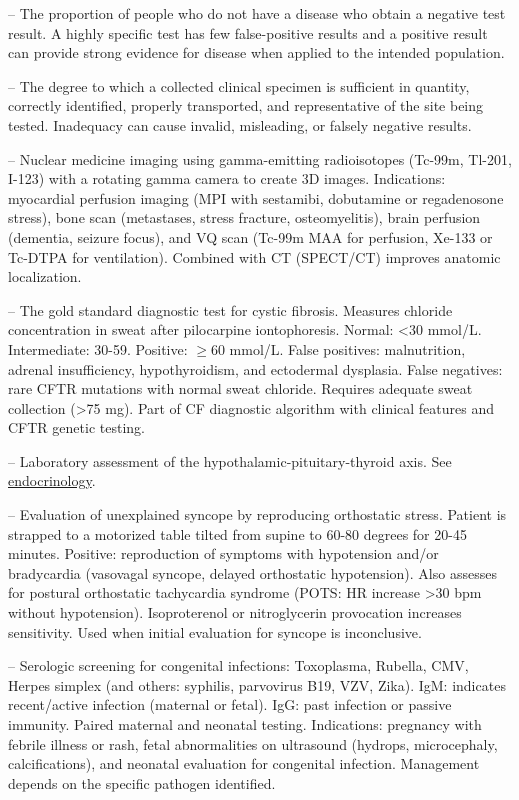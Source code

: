 -- The proportion of people who do not have a disease who obtain a negative test result. A highly specific test has few false-positive results and a positive result can provide strong evidence for disease when applied to the intended population.

-- The degree to which a collected clinical specimen is sufficient in quantity, correctly identified, properly transported, and representative of the site being tested. Inadequacy can cause invalid, misleading, or falsely negative results.

-- Nuclear medicine imaging using gamma-emitting radioisotopes (Tc-99m, Tl-201, I-123) with a rotating gamma camera to create 3D images. Indications: myocardial perfusion imaging (MPI with sestamibi, dobutamine or regadenosone stress), bone scan (metastases, stress fracture, osteomyelitis), brain perfusion (dementia, seizure focus), and VQ scan (Tc-99m MAA for perfusion, Xe-133 or Tc-DTPA for ventilation). Combined with CT (SPECT/CT) improves anatomic localization.

-- The gold standard diagnostic test for cystic fibrosis. Measures chloride concentration in sweat after pilocarpine iontophoresis. Normal: <30 mmol/L. Intermediate: 30-59. Positive: \(\ge\)60 mmol/L. False positives: malnutrition, adrenal insufficiency, hypothyroidism, and ectodermal dysplasia. False negatives: rare CFTR mutations with normal sweat chloride. Requires adequate sweat collection (>75 mg). Part of CF diagnostic algorithm with clinical features and CFTR genetic testing.

-- Laboratory assessment of the hypothalamic-pituitary-thyroid axis. See \hyperlink{Endocrinology}{endocrinology}.

-- Evaluation of unexplained syncope by reproducing orthostatic stress. Patient is strapped to a motorized table tilted from supine to 60-80 degrees for 20-45 minutes. Positive: reproduction of symptoms with hypotension and/or bradycardia (vasovagal syncope, delayed orthostatic hypotension). Also assesses for postural orthostatic tachycardia syndrome (POTS: HR increase >30 bpm without hypotension). Isoproterenol or nitroglycerin provocation increases sensitivity. Used when initial evaluation for syncope is inconclusive.

-- Serologic screening for congenital infections: Toxoplasma, Rubella, CMV, Herpes simplex (and others: syphilis, parvovirus B19, VZV, Zika). IgM: indicates recent/active infection (maternal or fetal). IgG: past infection or passive immunity. Paired maternal and neonatal testing. Indications: pregnancy with febrile illness or rash, fetal abnormalities on ultrasound (hydrops, microcephaly, calcifications), and neonatal evaluation for congenital infection. Management depends on the specific pathogen identified.

